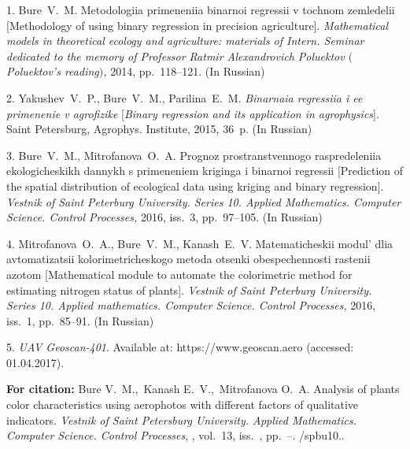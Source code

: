 {\footnotesize

\vskip 4mm


\vskip 3mm


1. {Bure~V.~M.} Metodologiia primeneniia binarnoi regressii v
tochnom zemledelii [Methodology of using binary regression in
precision agriculture]. {\it Mathematical models in theoretical
ecology and agriculture: materials of Intern. Seminar dedicated to
the memory of Professor Ratmir Alexandrovich Poluektov
$($Poluektov's reading$)$,} 2014, pp.~118--121. (In Russian)

2. {Yakushev~V.~P., Bure~V.~M., Parilina~E.~M.} {\it Binarnaia
regressiia i ee primenenie v agrofizike} [{\it Binary regression
and its application in agrophysics}]. Saint Petersburg, Agrophys.
Institute, 2015, 36~p. (In Russian)

3. {Bure~V.~M.,  Mitrofanova~O.~A.} Prognoz prostranstvennogo
raspredeleniia ekologicheskikh dannykh s primeneniem kriginga i
binarnoi regressii [Prediction of the spatial distribution of
ecological data using kriging and binary regression]. {\it Vestnik
of Saint Peterburg University. Series 10. Applied Mathematics.
Computer Science. Control Processes,} 2016, iss.~3, pp.~97--105.
(In Russian)

4. { Mitrofanova~O.~A., Bure~V.~M., Kanash~E.~V.} Matematicheskii
modul' dlia avtomatizatsii kolorimetricheskogo metoda otsenki
obespechennosti rastenii azotom [Mathematical module to automate
the colorimetric method for estimating nitrogen status of plants].
{\it Vestnik of Saint Peterburg University. Series 10. Applied
mathematics. Computer Science. Control Processes,} 2016, iss.~1,
pp.~85--91. (In Russian)

5. {\it UAV Geoscan-401}. Available at: https://www.geoscan.aero
(accessed: 01.04.2017).




\vskip 2mm

{\bf For citation:} Bure  V.~M.,~Kanash E.~V.,~Mitrofanova O.~A.
Analysis of plants color characteristics using aerophotos with
different factors of qualitative indicators. {\it Vestnik of Saint
Petersburg University. Applied Mathematics. Computer Science.
Control Processes}, \issueyear, vol.~13, iss.~\issuenum,
pp.~\pageref{p5}--\pageref{p5e}.
\doivyp/spbu10.\issueyear.


}
